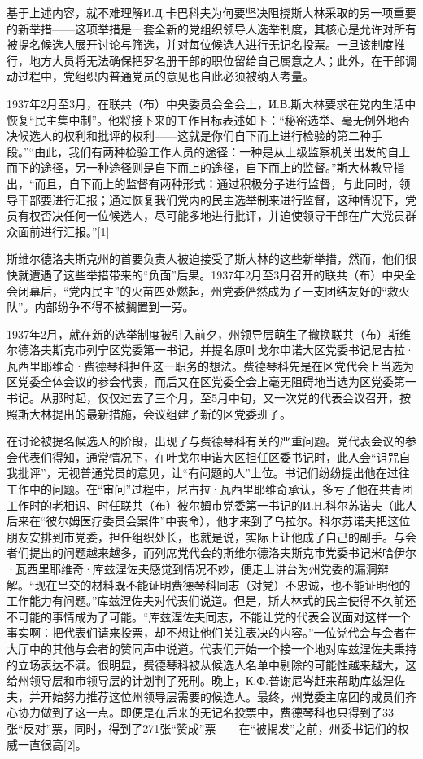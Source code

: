 
基于上述内容，就不难理解И.Д.卡巴科夫为何要坚决阻挠斯大林采取的另一项重要的新举措——这项举措是一套全新的党组织领导人选举制度，其核心是允许对所有被提名候选人展开讨论与筛选，并对每位候选人进行无记名投票。一旦该制度推行，地方大员将无法确保把罗名册干部的职位留给自己属意之人；此外，在干部调动过程中，党组织内普通党员的意见也自此必须被纳入考量。

1937年2月至3月，在联共（布）中央委员会全会上，И.В.斯大林要求在党内生活中恢复“民主集中制”。他将接下来的工作目标表述如下：“秘密选举、毫无例外地否决候选人的权利和批评的权利——这就是你们自下而上进行检验的第二种手段。”“由此，我们有两种检验工作人员的途径：一种是从上级监察机关出发的自上而下的途径，另一种途径则是自下而上的途径，自下而上的监督。”斯大林教导指出，“而且，自下而上的监督有两种形式：通过积极分子进行监督，与此同时，领导干部要进行汇报；通过恢复我们党内的民主选举制来进行监督，这种情况下，党员有权否决任何一位候选人，尽可能多地进行批评，并迫使领导干部在广大党员群众面前进行汇报。”[1]

斯维尔德洛夫斯克州的首要负责人被迫接受了斯大林的这些新举措，然而，他们很快就遭遇了这些举措带来的“负面”后果。1937年2月至3月召开的联共（布）中央全会闭幕后，“党内民主”的火苗四处燃起，州党委俨然成为了一支团结友好的“救火队”。内部纷争不得不被搁置到一旁。

1937年2月，就在新的选举制度被引入前夕，州领导层萌生了撤换联共（布）斯维尔德洛夫斯克市列宁区党委第一书记，并提名原叶戈尔申诺大区党委书记尼古拉·瓦西里耶维奇·费德琴科担任这一职务的想法。费德琴科先是在区党代会上当选为区党委全体会议的参会代表，而后又在区党委全会上毫无阻碍地当选为区党委第一书记。从那时起，仅仅过去了三个月，至5月中旬，又一次党的代表会议召开，按照斯大林提出的最新措施，会议组建了新的区党委班子。

在讨论被提名候选人的阶段，出现了与费德琴科有关的严重问题。党代表会议的参会代表们得知，通常情况下，在叶戈尔申诺大区担任区委书记时，此人会“诅咒自我批评”，无视普通党员的意见，让“有问题的人”上位。书记们纷纷提出他在过往工作中的问题。在“审问”过程中，尼古拉·瓦西里耶维奇承认，多亏了他在共青团工作时的老相识、时任联共（布）彼尔姆市党委第一书记的И.Н.科尔苏诺夫（此人后来在“彼尔姆医疗委员会案件”中丧命），他才来到了乌拉尔。科尔苏诺夫把这位朋友安排到市党委，担任组织处长，也就是说，实际上让他成了自己的副手。与会者们提出的问题越来越多，而列席党代会的斯维尔德洛夫斯克市党委书记米哈伊尔·瓦西里耶维奇·库兹涅佐夫感觉到情况不妙，便走上讲台为州党委的漏洞辩解。“现在呈交的材料既不能证明费德琴科同志（对党）不忠诚，也不能证明他的工作能力有问题。”库兹涅佐夫对代表们说道。但是，斯大林式的民主使得不久前还不可能的事情成为了可能。“库兹涅佐夫同志，不能让党的代表会议面对这样一个事实啊：把代表们请来投票，却不想让他们关注表决的内容。”一位党代会与会者在大厅中的其他与会者的赞同声中说道。代表们开始一个接一个地对库兹涅佐夫秉持的立场表达不满。很明显，费德琴科被从候选人名单中剔除的可能性越来越大，这给州领导层和市领导层的计划判了死刑。晚上，К.Ф.普谢尼岑赶来帮助库兹涅佐夫，并开始努力推荐这位州领导层需要的候选人。最终，州党委主席团的成员们齐心协力做到了这一点。即便是在后来的无记名投票中，费德琴科也只得到了33张“反对”票，同时，得到了271张“赞成”票——在“被揭发”之前，州委书记们的权威一直很高[2]。

